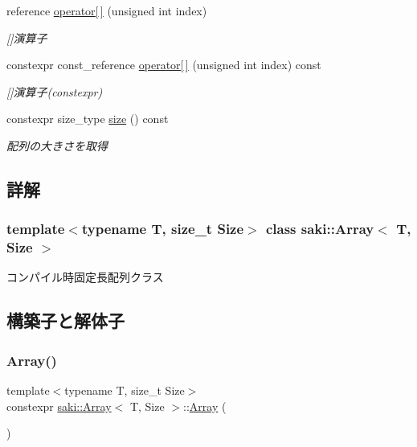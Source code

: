 \begin{DoxyCompactItemize}
\item 
reference \mbox{\hyperlink{classsaki_1_1_array_a58ffdb4c5484609ccdf0af3fb788fbfe}{operator\mbox{[}$\,$\mbox{]}}} (unsigned int index)
\begin{DoxyCompactList}\small\item\em \mbox{[}\mbox{]}演算子 \end{DoxyCompactList}\item 
constexpr const\+\_\+reference \mbox{\hyperlink{classsaki_1_1_array_a7ce9f5d7c63be78fb398d0e3afa804ea}{operator\mbox{[}$\,$\mbox{]}}} (unsigned int index) const
\begin{DoxyCompactList}\small\item\em \mbox{[}\mbox{]}演算子(constexpr) \end{DoxyCompactList}\item 
constexpr size\+\_\+type \mbox{\hyperlink{classsaki_1_1_array_a40cb0e5c23bc649a9e3cb7eaf5fd00ed}{size}} () const
\begin{DoxyCompactList}\small\item\em 配列の大きさを取得 \end{DoxyCompactList}\end{DoxyCompactItemize}


\subsection{詳解}
\subsubsection*{template$<$typename T, size\+\_\+t Size$>$\newline
class saki\+::\+Array$<$ T, Size $>$}

コンパイル時固定長配列クラス 

\subsection{構築子と解体子}
\mbox{\label{classsaki_1_1_array_ab5e2245491b5c663807732f3c1d0aae7}} 
\subsubsection{\texorpdfstring{Array()}{Array()}\hspace{0.1cm}{\footnotesize\ttfamily [1/4]}}
{\footnotesize\ttfamily template$<$typename T, size\+\_\+t Size$>$ \\
constexpr \mbox{\hyperlink{classsaki_1_1_array}{saki\+::\+Array}}$<$ T, Size $>$\+::\mbox{\hyperlink{classsaki_1_1_array}{Array}} (\begin{DoxyParamCaption}{ }\end{DoxyParamCaption})\hspace{0.3cm}{\ttfamily [inline]}}



